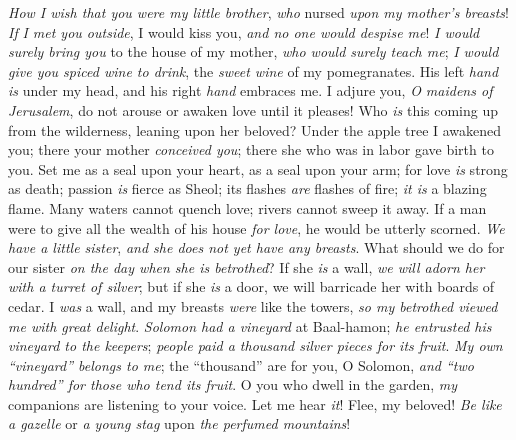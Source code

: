 \begin{biblechapter} %
 \textit{How I wish that you were my little brother}, 
\textit{who} nursed \textit{upon my mother’s breasts}! 
\textit{If} \textit{I met you outside}, I would kiss you, 
\textit{and no one would despise me}!
\verse \textit{I would surely bring you} to the house of my mother, 
\textit{who would surely teach me}; 
\textit{I would give you spiced wine to drink}, 
the \textit{sweet wine} of my pomegranates.
 His left \textit{hand is} under my head, 
and his right \textit{hand} embraces me.
\verse I adjure you, \textit{O maidens of Jerusalem}, 
do not arouse or awaken love until it pleases!
 Who \textit{is} this coming up from the wilderness, 
leaning upon her beloved? 
Under the apple tree I awakened you; 
there your mother \textit{conceived you}; 
there she who was in labor gave birth to you.
 Set me as a seal upon your heart, 
as a seal upon your arm; 
for love \textit{is} strong as death; 
passion \textit{is} fierce as Sheol; 
its flashes \textit{are} flashes of fire; 
\textit{it is} a blazing flame.
\verse Many waters cannot quench love; 
rivers cannot sweep it away. 
If a man were to give all the wealth of his house \textit{for love}, 
he would be utterly scorned.
 \textit{We have a little sister}, 
\textit{and she does not yet have any breasts}. 
What should we do for our sister 
\textit{on the day when she is betrothed}?
\verse If she \textit{is} a wall, 
\textit{we will adorn her with a turret of silver}; 
but if she \textit{is} a door, 
we will barricade her with boards of cedar.
\verse I \textit{was} a wall, and my breasts \textit{were} like the towers, 
\textit{so \textit{my betrothed} viewed me with great delight}.
 \textit{Solomon had a vineyard} at Baal-hamon; 
\textit{he entrusted his vineyard to the keepers}; 
\textit{people paid a thousand silver \textit{pieces} for its fruit}.
\verse \textit{My own “vineyard” belongs to me}; 
the “thousand” are for you, O Solomon, 
\textit{and “two hundred” for those who tend its fruit}.
 O you who dwell in the garden, 
\textit{my} companions are listening to your voice. 
Let me hear \textit{it}!
\verse Flee, my beloved! 
\textit{Be like a gazelle} or \textit{a young stag} 
upon \textit{the perfumed mountains}!
\end{biblechapter}

